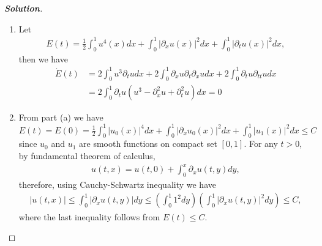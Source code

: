 \documentclass[11pt,reqno]{amsart}
\newcommand{\<}{\langle}
\renewcommand{\>}{\rangle}
\newcommand{\norm}[1]{\vert#1\vert}
\newcommand{\pa}{\partial}
\begin{document}
\begin{enumerate}[label={\arabic*.}]
\begin{proof}[\bf{Solution}]
\leavevmode
\begin{enumerate}
\item Let 
\begin{align*}
E(t) =\frac{1}{2} \int_0^1 u^4 (x) dx + \int_0^1 \norm{\pa_x u(x)}^2 dx + \int_0^1 \norm{\pa_t u(x)}^2 dx,
\end{align*}
then we have 
\begin{align*}
\dot{E}(t) 
&= 
2\int_0^1 u^3 \pa_t u dx + 2\int_0^1 \pa_x u \pa_t \pa_x u dx + 2\int_0^1 \pa_t u \pa_{tt}u dx\\
&=
2\int_0^1 \pa_t u (u^3 -\pa_x^2 u + \pa_t^2 u) dx = 0
\end{align*}
\item From part (a) we have $E(t) = E(0) =\frac{1}{2} \int_0^1 \norm{u_0(x)}^4 dx + \int_0^1 \norm{\pa_x u_0(x)}^2dx + \int_0^1 \norm{u_1(x)}^2 dx \leq C$ since $u_0$ and $u_1$ are smooth functions on compact set $[0,1]$. For any $t>0$, by fundamental theorem of calculus,
\begin{align*}
u(t,x) = u(t,0) + \int_0^x \pa_x u(t, y) dy, 
\end{align*}
therefore, using Cauchy-Schwartz inequality we have
\begin{align*}
\norm{u(t,x)} \leq \int_0^1 \norm{\pa_x u(t,y)} dy \leq (\int_0^1 1^2 dy) (\int_0^1 \norm{\pa_x u (t,y)}^2 dy) \leq C,
\end{align*}
where the last inequality follows from $E(t) \leq C$.
\end{enumerate}
\end{proof}



\end{enumerate}
\end{document}
